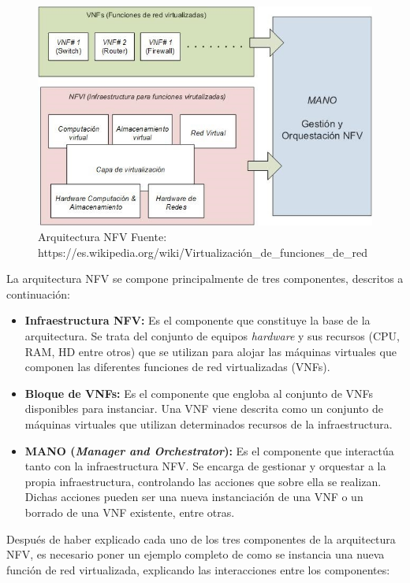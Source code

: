 \begin{figure}[!ht]
	\centering
	\includegraphics[width=0.75\linewidth]{imagenes/arquitectura_nfv}
	\caption{Arquitectura NFV Fuente: https://es.wikipedia.org/wiki/Virtualización\_de\_funciones\_de\_red}
	\label{fig:arquitecturanfv}
\end{figure}

La arquitectura NFV se compone principalmente de tres componentes, descritos a continuación:

\begin{itemize}
	\item \textbf{Infraestructura NFV:} Es el componente que constituye la base de la arquitectura. Se trata del conjunto de equipos \textit{hardware} y sus recursos (CPU, RAM, HD entre otros) que se utilizan para alojar las máquinas virtuales que componen las diferentes funciones de red virtualizadas (VNFs).
	
	\item \textbf{Bloque de VNFs:} Es el componente que engloba al conjunto de VNFs disponibles para instanciar. Una VNF viene descrita como un conjunto de máquinas virtuales que utilizan determinados recursos de la infraestructura.
	
	\item \textbf{MANO (\textit{Manager and Orchestrator}):} Es el componente que interactúa tanto con la infraestructura NFV. Se encarga de gestionar y orquestar a la propia infraestructura, controlando las acciones que sobre ella se realizan. Dichas acciones pueden ser una nueva instanciación de una VNF o un borrado de una VNF existente, entre otras.
	
\end{itemize}

Después de haber explicado cada uno de los tres componentes de la arquitectura NFV, es necesario poner un ejemplo completo de como se instancia una nueva función de red virtualizada, explicando las interacciones entre los componentes:

